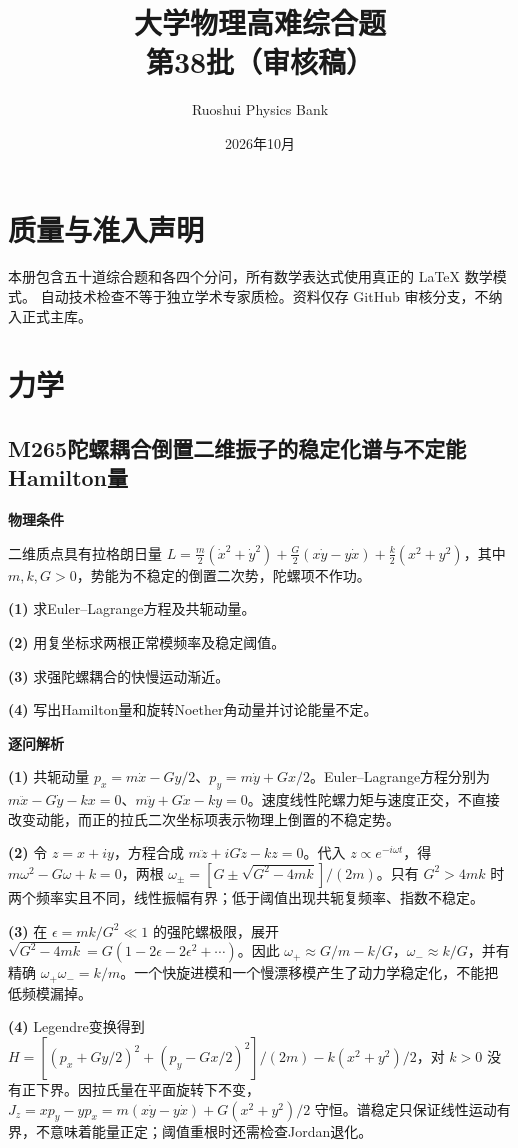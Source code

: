 \documentclass[UTF8,a4paper,11pt,oneside,openany]{ctexbook}
\begin{document}
\title{\textcolor{accent}{大学物理高难综合题}\\\Large 第38批（审核稿）}
\author{Ruoshui Physics Bank}
\date{2026年10月}
\maketitle
\tableofcontents
\chapter*{质量与准入声明}
本册包含五十道综合题和各四个分问，所有数学表达式使用真正的 \LaTeX{} 数学模式。
自动技术检查不等于独立学术专家质检。资料仅存 GitHub 审核分支，不纳入正式主库。

\chapter{力学}
\section*{M265\quad 陀螺耦合倒置二维振子的稳定化谱与不定能Hamilton量}
\textbf{物理条件}\par 二维质点具有拉格朗日量 \(L=\tfrac m2(\dot x^2+\dot y^2)+\tfrac G2(x\dot y-y\dot x)+\tfrac k2(x^2+y^2)\)，其中 \(m,k,G>0\)，势能为不稳定的倒置二次势，陀螺项不作功。
\par\noindent\textbf{(1)} 求Euler–Lagrange方程及共轭动量。
\par\noindent\textbf{(2)} 用复坐标求两根正常模频率及稳定阈值。
\par\noindent\textbf{(3)} 求强陀螺耦合的快慢运动渐近。
\par\noindent\textbf{(4)} 写出Hamilton量和旋转Noether角动量并讨论能量不定。

\par\medskip\noindent\textbf{逐问解析}
\par\noindent\textbf{(1)} 共轭动量 \(p_x=m\dot x-Gy/2\)、\(p_y=m\dot y+Gx/2\)。Euler–Lagrange方程分别为 \(m\ddot x-G\dot y-kx=0\)、\(m\ddot y+G\dot x-ky=0\)。速度线性陀螺力矩与速度正交，不直接改变动能，而正的拉氏二次坐标项表示物理上倒置的不稳定势。
\par\noindent\textbf{(2)} 令 \(z=x+iy\)，方程合成 \(m\ddot z+iG\dot z-kz=0\)。代入 \(z\propto e^{-i\omega t}\)，得 \(m\omega^2-G\omega+k=0\)，两根 \(\omega_\pm=[G\pm\sqrt{G^2-4mk}]/(2m)\)。只有 \(G^2>4mk\) 时两个频率实且不同，线性振幅有界；低于阈值出现共轭复频率、指数不稳定。
\par\noindent\textbf{(3)} 在 \(\epsilon=mk/G^2\ll1\) 的强陀螺极限，展开 \(\sqrt{G^2-4mk}=G(1-2\epsilon-2\epsilon^2+\cdots)\)。因此 \(\omega_+\approx G/m-k/G\)，\(\omega_-\approx k/G\)，并有精确 \(\omega_+\omega_-=k/m\)。一个快旋进模和一个慢漂移模产生了动力学稳定化，不能把低频模漏掉。
\par\noindent\textbf{(4)} Legendre变换得到 \(H=[(p_x+Gy/2)^2+(p_y-Gx/2)^2]/(2m)-k(x^2+y^2)/2\)，对 \(k>0\) 没有正下界。因拉氏量在平面旋转下不变，\(J_z=xp_y-yp_x=m(x\dot y-y\dot x)+G(x^2+y^2)/2\) 守恒。谱稳定只保证线性运动有界，不意味着能量正定；阈值重根时还需检查Jordan退化。
\end{document}
